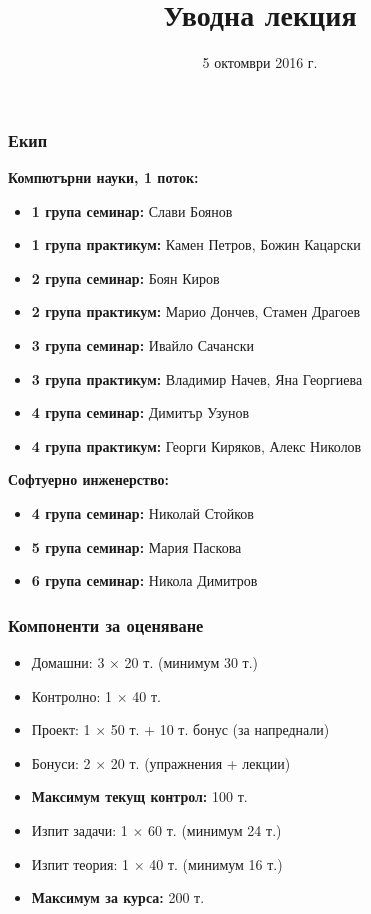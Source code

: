 \documentclass{beamer}
\title{Уводна лекция}
\date{5 октомври 2016 г.}
\begin{document}
\begin{frame}
  \titlepage
\end{frame}

\begin{frame}
  \frametitle{Екип}

  \textbf{Компютърни науки, 1 поток:}
  \begin{itemize}
  \item \textbf{1 група семинар:} Слави Боянов
  \item \textbf{1 група практикум:} Камен Петров, Божин Кацарски
  \item \textbf{2 група семинар:} Боян Киров
  \item \textbf{2 група практикум:} Марио Дончев, Стамен Драгоев
  \item \textbf{3 група семинар:} Ивайло Сачански
  \item \textbf{3 група практикум:} Владимир Начев, Яна Георгиева
  \item \textbf{4 група семинар:} Димитър Узунов
  \item \textbf{4 група практикум:} Георги Киряков, Алекс Николов
  \end{itemize}
  \textbf{Софтуерно инженерство:}
  \begin{itemize}
  \item \textbf{4 група семинар:} Николай Стойков
  \item \textbf{5 група семинар:} Мария Паскова
  \item \textbf{6 група семинар:} Никола Димитров
  \end{itemize}
\end{frame}

\begin{frame}
  \frametitle{Компоненти за оценяване}
  
  \begin{itemize}
  \item Домашни: 3 $\times$ 20 т. \alert{(минимум 30 т.)}
  \item Контролно: 1 $\times$ 40 т.
  \item Проект: 1 $\times$ 50 т. + 10 т. бонус (за напреднали)
  \item Бонуси: 2 $\times$ 20 т. (упражнения + лекции)
  \item \textbf{Максимум текущ контрол:} 100 т.
  \item Изпит задачи: 1 $\times$ 60 т. \alert{(минимум 24 т.)}
  \item Изпит теория: 1 $\times$ 40 т. \alert{(минимум 16 т.)}
  \item \textbf{Максимум за курса:} 200 т.
  \end{itemize}
\end{frame}
\end{document}
